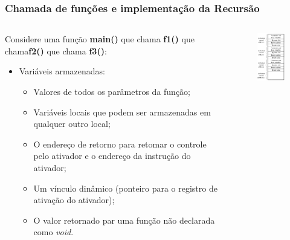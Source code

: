\documentclass[10pt]{beamer}
\begin{document}
\begin{frame}
  \frametitle{Chamada de funções e implementação da Recursão}
  \begin{columns}[t]
    \begin{column}{6cm}
      Considere uma função \textbf{main()} que chama \textbf{f1()} que chama\textbf{f2()} que chama \textbf{f3()}:
      \begin{itemize}
        \item Variáveis armazenadas:
              \begin{itemize}
                \item Valores de todos os parâmetros da função;
                \item Variáveis locais que podem ser armazenadas em qualquer outro local;
                \item O endereço de retorno para retomar o controle pelo ativador e o endereço da instrução do ativador;
                \item Um vínculo dinâmico (ponteiro para o registro de ativação do ativador);
                \item O valor retornado par uma função não declarada como \emph{void}.
              \end{itemize}
      \end{itemize}
    \end{column}
    \begin{column}{6cm}
      \begin{figure}[h]
        \begin{center}
          \includegraphics[width=4cm]{fig/img05}
        \end{center}
      \end{figure}
    \end{column}
  \end{columns}
\end{frame}
\end{document}
